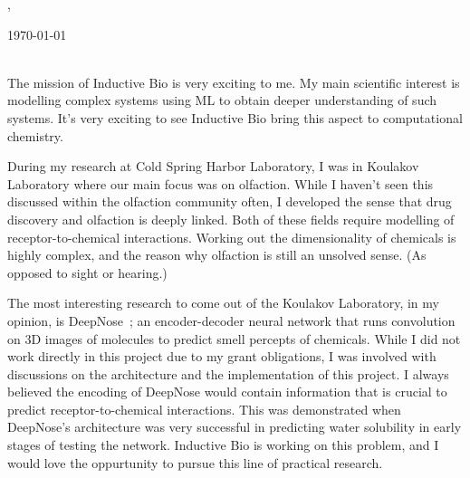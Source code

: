 \documentclass[12pt]{letter}
\begin{document}
\AddToShipoutPictureBG{%
  \color{gr}
  \AtPageUpperLeft{\rule[-1.3in]{\paperwidth}{1.3in}}
}

\begin{center}
  {\fontsize{28}{0}\selectfont\scshape \myname, \mytitle} \\
  \vspace{0.1in}
  \href{mailto:\myemail}{\faEnvelope\enspace \myemail}\hfill
  \href{https://linkedin.com/in/\mylinkedin}{\faLinkedinIn\enspace\mylinkedin}\hfill
  \href{tel:\myphone}{\faPhone\enspace \myphone}\hfill
  \faMapMarker\enspace \mylocation
\end{center}

\vspace{0.2in}

\today\vspace{0.1in}\\

\vspace{-0.1in}\greeting\ \recipient \\

\vspace{-0.1in}\setlength\parindent{24pt}
\noindent

The mission of Inductive Bio is very exciting to me.
My main scientific interest is modelling complex systems using ML to
obtain deeper understanding of such systems.
It's very exciting to see Inductive Bio bring this aspect to
computational chemistry.

During my research at Cold Spring Harbor Laboratory, I was in
Koulakov Laboratory where our
main focus was on olfaction.
While I haven't seen this discussed within the olfaction community often,
I developed the sense that drug discovery and olfaction is deeply linked.
Both of these fields require modelling of receptor-to-chemical interactions.
Working out the dimensionality of chemicals is highly complex, and
the reason why olfaction is still an unsolved sense. (As opposed to
sight or hearing.)

The most interesting research to come out of the Koulakov Laboratory,
in my opinion, is
DeepNose~\cite{deepnose};
an encoder-decoder neural network that runs convolution on 3D images
of molecules to predict smell percepts of chemicals.
While I did not work directly in this project due to my grant obligations,
I was involved with discussions on the architecture and the
implementation of this project.
I always believed the encoding of DeepNose would contain
information that is crucial to predict receptor-to-chemical interactions.
This was demonstrated when DeepNose's architecture was very
successful in predicting water solubility in early stages of testing
the network.
Inductive Bio is working on this problem, and I would love the
oppurtunity to pursue this line of practical research.
\end{document}
